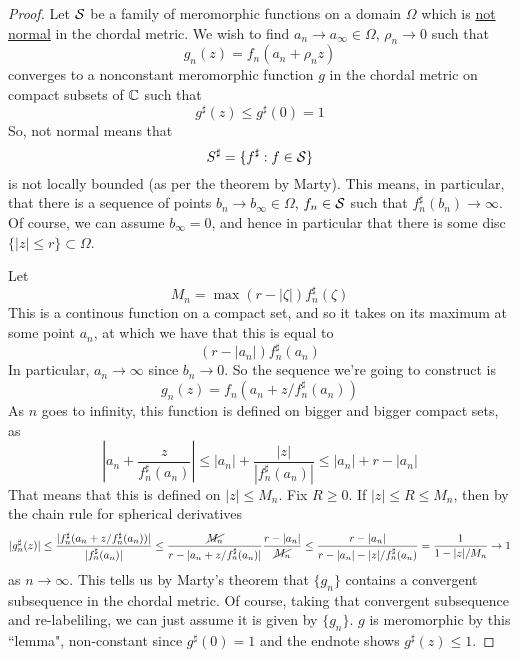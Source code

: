 \documentclass{article}
\begin{document}
\begin{proof}
Let \(\mathcal{S}\) be a family of meromorphic functions on a domain \(\Omega\) which is \underline{not normal} in the chordal metric. We wish to find \(a_n \to a_\infty \in \Omega\), \(\rho_n \to 0\) such that
\begin{equation}g_n(z) = f_n(a_n + \rho_n z)\end{equation}
converges to a nonconstant meromorphic function \(g\) in the chordal metric on compact subsets of \(\mathbb{C}\) such that
\begin{equation}g^\sharp(z) \leq g^\sharp(0) = 1\end{equation}
So, not normal means that
\begin{equation}S^\sharp = \{f^\sharp: f \in \mathcal{S}\}\end{equation}
is not locally bounded (as per the theorem by Marty). This means, in particular, that there is a sequence of points \(b_n \to b_\infty \in \Omega\), \(f_n \in \mathcal{S}\) such that \(f_n^\sharp(b_n) \to \infty\). Of course, we can assume \(b_\infty = 0\), and hence in particular that there is some disc \(\{|z| \leq r\} \subset \Omega\).

Let
\begin{equation}M_n = \max(r - |\zeta|)f_n^\sharp(\zeta)\end{equation}
This is a continous function on a compact set, and so it takes on its maximum at some point \(a_n\), at which we have that this is equal to
\begin{equation}(r - |a_n|)f_n^\sharp(a_n)\end{equation}
In particular, \(a_n \to \infty\) since \(b_n \to 0\). So the sequence we're going to construct is
\begin{equation}g_n(z) = f_n(a_n + z/f_n^\sharp(a_n))\end{equation}
As \(n\) goes to infinity, this function is defined on bigger and bigger compact sets, as
\begin{equation}\left|a_n + \frac{z}{f_n^\sharp(a_n)}\right| \leq |a_n| + \frac{|z|}{|f_n^\sharp(a_n)|} \leq |a_n| + r - |a_n|\end{equation}
That means that this is defined on \(|z| \leq M_n\). Fix \(R \geq 0\). If \(|z| \leq R \leq M_n\), then by the chain rule for spherical derivatives
\begin{equation}|g_n^\sharp(z)| \leq \frac{|f_n^\sharp(a_n + z/f_n^\sharp(a_n))|}{|f_n^\sharp(a_n)|} \leq \frac{\cancel{M_n}}{r - |a_n + z/f_n^\sharp(a_n)|}\frac{r - |a_n|}{\cancel{M_n}} \leq \frac{r - |a_n|}{r - |a_n| - |z|/f_n^\sharp(a_n)} = \frac{1}{1  - |z|/M_n} \to 1\end{equation}
as \(n \to \infty\). This tells us by Marty's theorem that \(\{g_n\}\) contains a convergent subsequence in the chordal metric. Of course, taking that convergent subsequence and re-labeliling, we can just assume it is given by \(\{g_n\}\). \(g\) is meromorphic by this ``lemma", non-constant since \(g^\sharp(0) = 1\) and the endnote shows \(g^\sharp(z) \leq 1\).
\end{proof}
\end{document}
